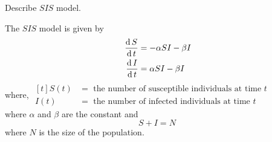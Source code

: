 \documentclass[../main-sheet.tex]{subfiles}
\begin{document}
\begin{prob}
    Describe \(SIS\) model.
\end{prob}
\begin{soln}
    The \(SIS\) model is given by
    \begin{align}
        \,\frac{\mathrm{d}\,S}{\mathrm{d}\,t}&=-\alpha SI-\beta I \label{eq:si1}\\
        \,\frac{\mathrm{d}\,I}{\mathrm{d}\,t}&=\alpha SI-\beta I \label{eq:si2}
    \end{align}
    where, \(\begin{aligned}[t]
        S(t)&= \text{ the number of susceptible individuals at time } t\\
        I(t)&= \text{ the number of infected individuals at time } t
    \end{aligned}\)\\
    where \(\alpha\) and \(\beta\) are the constant and
    \begin{equation}
        S+I=N\label{eq:si3}
    \end{equation}
    where \(N\) is the size of the population.\\


\end{soln}
\end{document}
